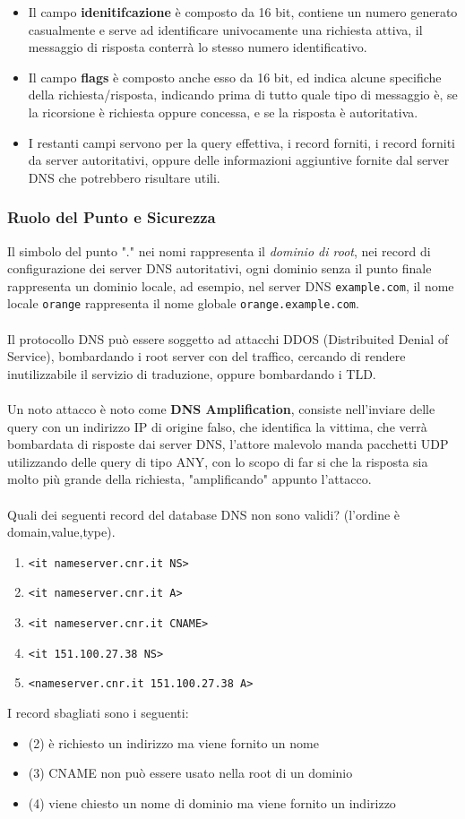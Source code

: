 \documentclass[12pt, letterpaper]{article}
\newcommand{\code}[1]{\colorbox{light-gray}{\texttt{#1}}}
\newcommand{\acc}{\\\hphantom{}\\}
\begin{document}
\begin{itemize}
    \item Il campo \textbf{idenitifcazione} è composto da 16 bit, contiene un numero generato casualmente
          e serve ad identificare univocamente una richiesta attiva, il messaggio di risposta conterrà lo stesso
          numero identificativo.
    \item Il campo \textbf{flags} è composto anche esso da 16 bit, ed indica alcune specifiche della
          richiesta/risposta, indicando prima di tutto quale  tipo di messaggio è, se la ricorsione è richiesta
          oppure concessa, e se la risposta è autoritativa.
    \item I restanti campi servono per la query effettiva, i record forniti, i record forniti da server
          autoritativi, oppure delle informazioni aggiuntive fornite dal server DNS che potrebbero risultare utili.
\end{itemize}
\subsubsection{Ruolo del Punto e Sicurezza}
Il simbolo del punto "." nei nomi rappresenta il \textit{dominio di root}, nei record di configurazione
dei server DNS autoritativi, ogni dominio senza il punto finale rappresenta un dominio locale, ad esempio,
nel server DNS \code{example.com}, il nome locale \code{orange} rappresenta il nome
globale \code{orange.example.com}.\acc
Il protocollo DNS può essere soggetto ad attacchi DDOS (Distribuited Denial of Service), bombardando i
root server con del traffico, cercando di rendere inutilizzabile il servizio di traduzione, oppure
bombardando i TLD.\acc
Un noto attacco è noto come \textbf{DNS Amplification}, consiste nell'inviare delle query con un indirizzo
IP di origine falso, che identifica la vittima, che verrà bombardata di risposte dai server DNS, l'attore malevolo
manda pacchetti UDP utilizzando delle query di tipo ANY, con lo scopo di far si che la risposta sia
molto più grande della richiesta, "amplificando" appunto l'attacco.\acc
Quali dei seguenti record del database DNS non sono validi? (l'ordine è domain,value,type).\begin{enumerate}
    \item \code{<it nameserver.cnr.it NS>}
    \item \code{<it nameserver.cnr.it A>}
    \item \code{<it nameserver.cnr.it CNAME>}
    \item \code{<it 151.100.27.38 NS>}
    \item \code{<nameserver.cnr.it 151.100.27.38 A>}
\end{enumerate}
I record sbagliati sono i seguenti:\begin{itemize}
    \item \color{red}(2) \color{black} è richiesto un indirizzo ma viene fornito un nome
    \item  \color{red}(3) \color{black} CNAME non può essere usato nella root di un dominio
    \item \color{red}(4) \color{black} viene chiesto un nome di dominio ma viene fornito un indirizzo
\end{itemize}
\end{document}

